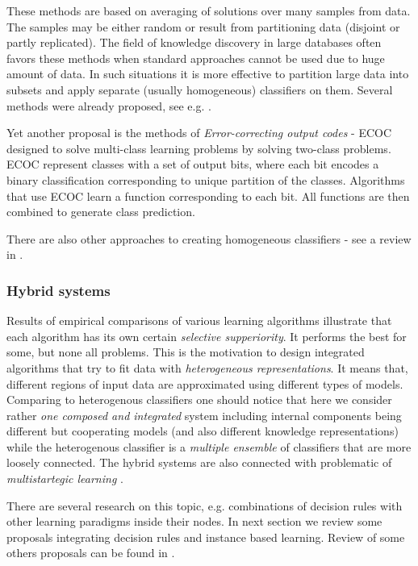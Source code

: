 \documentclass{article}
\begin{document}

These methods are based on averaging of solutions over many
samples from data. The samples may be either random or result from
partitioning data (disjoint or partly replicated). The field of
knowledge discovery in large databases often favors these methods
when standard approaches cannot be used due to huge amount of
data. In such situations it is more effective to partition large
data into subsets and apply separate (usually homogeneous)
classifiers on them. Several methods were already proposed, see
e.g. \cite {CS95,Jel96,Lit}.\newline


Yet another proposal is the methods of {\em Error-correcting
output codes} - ECOC \cite{DieB} designed to solve multi-class
learning problems by solving two-class problems. ECOC represent
classes with a set of output bits, where each bit encodes a binary
classification corresponding to unique partition of the classes.
Algorithms that use ECOC learn a function corresponding to each
bit. All functions are then combined to generate class prediction.

There are also other approaches to creating homogeneous
classifiers - see a review in \cite{Gama}.

\subsubsection{Hybrid systems}

Results of empirical comparisons of various learning algorithms
\cite{Mitche} illustrate that each algorithm has its own certain
{\em selective supperiority}. It performs the best for some, but
none all problems. This is the motivation to design integrated
algorithms that try to fit data with {\em heterogeneous
representations}. It means that, different regions of input data
are approximated using different types of models. Comparing to
heterogenous classifiers one should notice that here we consider
rather {\em one composed and integrated} system including internal
components being different but cooperating models (and also
different knowledge representations) while the heterogenous
classifier is a {\em multiple ensemble} of classifiers that are
more loosely connected. The hybrid systems are also connected with
problematic of {\em multistartegic learning} \cite{MichTe}.

There are several research on this topic, e.g. combinations of
decision rules with other learning paradigms inside their nodes.
In next section we review some proposals integrating decision
rules and instance based learning. Review of some others proposals
can be found in \cite{MichTe}.
\end{document}
